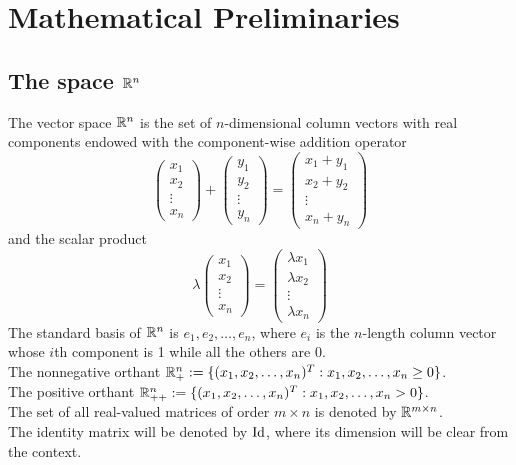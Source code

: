 \documentclass[10pt,a4paper]{article}
\begin{document}
\section{Mathematical Preliminaries}

\subsection{The space $\mathbb{R}^n$}
The vector space $\mathbb{R}^n$  is the set of $n$-dimensional column vectors with real components endowed with the component-wise addition operator
\begin{equation*}
	\begin{pmatrix}
		x_1\\
		x_2\\
		\vdots\\
		x_n
	\end{pmatrix}
+
\begin{pmatrix}
	y_1\\
	y_2\\
	\vdots\\
	y_n
\end{pmatrix}
= 
\begin{pmatrix}
	x_1+y_1\\
	x_2+y_2\\
	\vdots\\
	x_n + y_n
\end{pmatrix}
\end{equation*}
and the scalar product
\begin{equation*}
	\lambda \begin{pmatrix}
		x_1\\
		x_2\\
		\vdots\\
		x_n
	\end{pmatrix}
= 
\begin{pmatrix}
	\lambda x_1\\
	\lambda x_2\\
	\vdots\\
	\lambda x_n
\end{pmatrix}
\end{equation*}
The standard basis of $\mathbb{R}^n$ is $e_1, e_2, \dots, e_n$, where $e_i$ is the $n$-length column vector whose $i$th component is 1 while all the others are 0.\\
The nonnegative orthant $\mathbb{R}^n_+:=\{(x_1,x_2, \dots, x_n)^T: x_1, x_2,\dots,x_n\geq 0\}$.\\
The positive orthant $\mathbb{R}^n_{++}:=\{(x_1,x_2, \dots, x_n)^T: x_1, x_2,\dots,x_n> 0\}$.\\
The set of all real-valued matrices of order $m \times n$ is denoted by $\mathbb{R}^{m\times n}$.\\
The identity matrix will be denoted by $\text{Id}$, where its dimension will be clear from the context.
\end{document}

